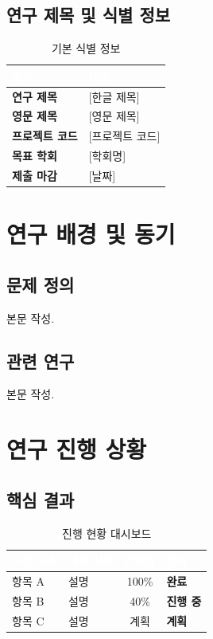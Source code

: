 \documentclass[11pt,a4paper]{article}
\newcommand{\tagdone}{\colorbox{accentgreen!20}{\small\color{accentgreen!80!black}\textbf{완료}}}
\newcommand{\taginprog}{\colorbox{accentorange!20}{\small\color{accentorange!80!black}\textbf{진행 중}}}
\newcommand{\tagplanned}{\colorbox{dgistmid!15}{\small\color{dgistblue}\textbf{계획}}}
\begin{document}
\subsection{연구 제목 및 식별 정보}
\begin{table}[H]
\centering\small
\begin{tabularx}{\linewidth}{|l|X|}
\hline
\rowcolor{tabhead}\textcolor{white}{\textbf{항목}} & \textcolor{white}{\textbf{내용}} \\
\hline
\textbf{연구 제목} & [한글 제목] \\
\hline
\textbf{영문 제목} & [영문 제목] \\
\hline
\textbf{프로젝트 코드} & [프로젝트 코드] \\
\hline
\textbf{목표 학회} & [학회명] \\
\hline
\textbf{제출 마감} & [날짜] \\
\hline
\end{tabularx}
\caption{기본 식별 정보}
\end{table}

\section{연구 배경 및 동기}
\subsection{문제 정의}
본문 작성.

\subsection{관련 연구}
본문 작성.

\section{연구 진행 상황}
\subsection{핵심 결과}
\begin{table}[H]
\centering\small
\begin{tabularx}{\linewidth}{|l|X|c|l|}
\hline
\rowcolor{tabhead}\textcolor{white}{\textbf{구성 요소}} & \textcolor{white}{\textbf{세부 사항}} & \textcolor{white}{\textbf{진행률}} & \textcolor{white}{\textbf{상태}} \\
\hline
항목 A & 설명 & 100\% & \tagdone \\
\hline
항목 B & 설명 & 40\% & \taginprog \\
\hline
항목 C & 설명 & 계획 & \tagplanned \\
\hline
\end{tabularx}
\caption{진행 현황 대시보드}
\end{table}
\end{document}
